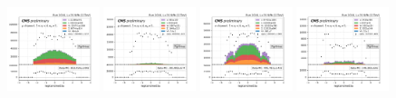 \begin{figure}
    \includegraphics[width=0.24\textwidth]{appendices/qcdSF/figures/123j1b/mu_leptonOneEta_True.png}
    \includegraphics[width=0.24\textwidth]{appendices/qcdSF/figures/123j1b/mu_leptonOneEta_False.png}
    \includegraphics[width=0.24\textwidth]{appendices/qcdSF/figures/123j1b/e_leptonOneEta_True.png}
    \includegraphics[width=0.24\textwidth]{appendices/qcdSF/figures/123j1b/e_leptonOneEta_False.png}
    

\end{figure}
